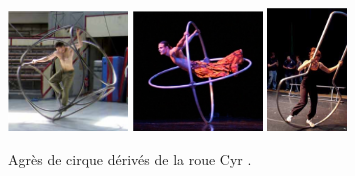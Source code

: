\begin{figure}[h]
\centering
\includegraphics[width=120]{images_autres/hyb1.png}
\includegraphics[width=130]{images_autres/hyb2.png}
\includegraphics[width=80]{images_autres/hyb3.png}
\caption{Agrès de cirque dérivés de la roue Cyr \cite{Fedec2011}.}
\label{fig:cyrhyb}
\end{figure}

